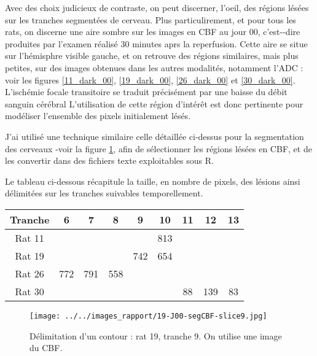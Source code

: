 \par
Avec des choix judicieux de contraste, on peut discerner,  l'oeil, des r\'egions l\'es\'ees sur les tranches segment\'ees de cerveau. %
Plus particulirement, et pour tous les rats, on discerne une aire sombre sur les images en CBF au jour 00, %
c'est--dire produites par l'examen r\'ealis\'e 30 minutes aprs la reperfusion. %
Cette aire se situe sur l'h\'emisphre visible  gauche, et on retrouve des r\'egions similaires, mais plus petites, %
sur des images obtenues dans les autres modalit\'es, notamment l'ADC : %
voir les figures \ref{11_dark_00}, \ref{19_dark_00}, \ref{26_dark_00} et \ref{30_dark_00}. %
L'isch\'emie focale transitoire se traduit pr\'ecis\'ement par une baisse du d\'ebit sanguin c\'er\'ebral %
L'utilisation de cette r\'egion d'int\'er\^et est donc pertinente pour mod\'eliser l'ensemble des pixels initialement l\'es\'es.

\etoile
J'ai utilis\'e une technique similaire  celle d\'etaill\'ee ci-dessus pour la segmentation des cerveaux -voir la figure \ref{cbf_seg_19}, %
afin de s\'electionner les r\'egions l\'es\'ees en CBF, et de les convertir dans des fichiers texte exploitables sous R.

\par
Le tableau ci-dessous r\'ecapitule la taille, en nombre de pixels, des l\'esions ainsi d\'elimit\'ees sur les tranches suivables temporellement.

\begin{multicols}{2}
\begin{tabular}{|c|c|c|c|c|c|c|c|c|}
\hline
\small{Tranche}&6&7&8&9&10&11&12&13
\\
\hline
Rat 11&&&&&813&&&
\\
\hline
Rat 19&&&&742&654&&&
\\
\hline
Rat 26&772&791&558&&&&&
\\
\hline
Rat 30&&&&&&88&139&83
\\
\hline
\end{tabular}

\columnbreak
\begin{figure}[H]
\begin{center}
\texttt{[image: ../../images\_rapport/19-J00-segCBF-slice9.jpg]}
\end{center}
\caption{D\'elimitation d'un contour : rat 19, tranche 9. On utilise une image du CBF.}
\label{cbf_seg_19}
\end{figure}
\end{multicols}



